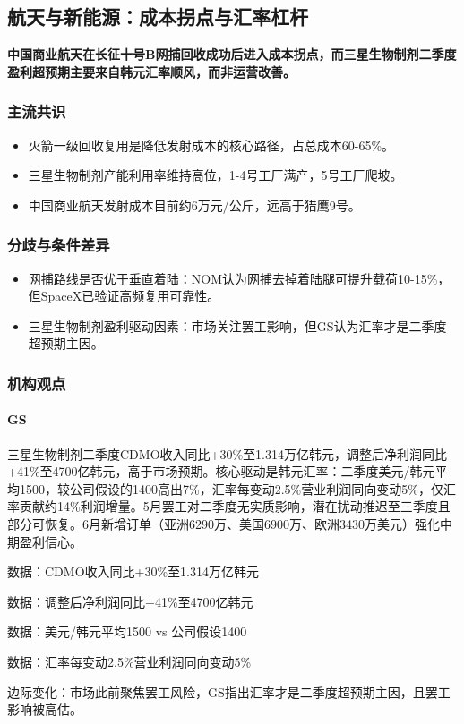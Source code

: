 \documentclass[11pt]{ctexart}
\begin{document}
\subsection{航天与新能源：成本拐点与汇率杠杆}
\textbf{中国商业航天在长征十号B网捕回收成功后进入成本拐点，而三星生物制剂二季度盈利超预期主要来自韩元汇率顺风，而非运营改善。}
\subsubsection*{主流共识}
\begin{itemize}
  \item 火箭一级回收复用是降低发射成本的核心路径，占总成本60-65\%。
  \item 三星生物制剂产能利用率维持高位，1-4号工厂满产，5号工厂爬坡。
  \item 中国商业航天发射成本目前约6万元/公斤，远高于猎鹰9号。
\end{itemize}
\subsubsection*{分歧与条件差异}
\begin{itemize}
  \item 网捕路线是否优于垂直着陆：NOM认为网捕去掉着陆腿可提升载荷10-15\%，但SpaceX已验证高频复用可靠性。
  \item 三星生物制剂盈利驱动因素：市场关注罢工影响，但GS认为汇率才是二季度超预期主因。
\end{itemize}
\subsubsection*{机构观点}
\paragraph{GS} 三星生物制剂二季度CDMO收入同比+30\%至1.314万亿韩元，调整后净利润同比+41\%至4700亿韩元，高于市场预期。核心驱动是韩元汇率：二季度美元/韩元平均1500，较公司假设的1400高出7\%，汇率每变动2.5\%营业利润同向变动5\%，仅汇率贡献约14\%利润增量。5月罢工对二季度无实质影响，潜在扰动推迟至三季度且部分可恢复。6月新增订单（亚洲6290万、美国6900万、欧洲3430万美元）强化中期盈利信心。
{\small\color{refgray}数据：CDMO收入同比+30\%至1.314万亿韩元\par}
{\small\color{refgray}数据：调整后净利润同比+41\%至4700亿韩元\par}
{\small\color{refgray}数据：美元/韩元平均1500 vs 公司假设1400\par}
{\small\color{refgray}数据：汇率每变动2.5\%营业利润同向变动5\%\par}
{\small\color{refgray}边际变化：市场此前聚焦罢工风险，GS指出汇率才是二季度超预期主因，且罢工影响被高估。\par}
\end{document}
